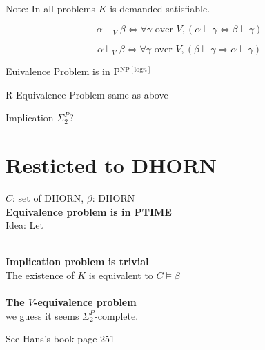 \documentclass[12pt]{article}
\begin{document}
\ \\ 

Note: In all problems $K$ is demanded satisfiable.

$$\alpha \equiv_V \beta \Longleftrightarrow \forall \gamma \mbox{ over } V, (\alpha\models \gamma \Leftrightarrow \beta\models \gamma) $$

$$\alpha \models_V \beta \Longleftrightarrow \forall \gamma \mbox{ over } V, (\beta\models \gamma \Longrightarrow \alpha\models \gamma) $$



Euivalence Problem is in P$^{\text{NP}[\text{log}n]}$

R-Equivalence Problem same as above

Implication  $\Sigma_2^P$?







\section{Resticted to DHORN}

$C$: set of DHORN, $\beta$: DHORN \\

{\bf Equivalence problem is in PTIME} \\

Idea: Let 




\ \\

{\bf Implication problem is trivial} \\ 

The existence of $K$ is equivalent to $C\models\beta$\\

\ \\


{\bf The $V$-equivalence problem}\\



we guess it seems $\Sigma_2^P$-complete.

See Hans's book page 251
\end{document}
